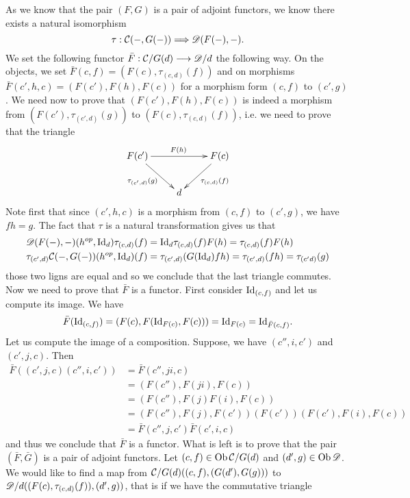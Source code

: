 \documentclass[11pt, a4paper, twoside]{article}
\begin{document}
As we know that the pair $(F,G)$ is a pair of adjoint functors, we know there exists a natural isomorphism
\begin{displaymath}
	\tau:\mathcal{C}(-,G(-))\Longrightarrow\mathscr D(F(-),-).
\end{displaymath}
We set the following functor $\bar{F}:\mathcal{C}/G(d)\longrightarrow\mathscr D/d$ the following way. On the objects, we set $\bar{F}(c,f)=(F(c),\tau_{(c,d)}(f))$ and on morphisms $\bar{F}(c',h,c)=(F(c'),F(h),F(c))$ for a morphism form $(c,f)$ to $(c',g)$. We need now to prove that $(F(c'),F(h),F(c))$ is indeed a morphism from $(F(c'),\tau_{(c',d)}(g))$ to $(F(c),\tau_{(c,d)}(f))$, i.e. we need to prove that the triangle
\begin{displaymath}
	\xymatrix{
		F(c') \ar[rd]_{\tau_{(c',d)}(g)} \ar[rr]^{F(h)} & & F(c) \ar[ld]^{\tau_{(c,d)}(f)}\\
		& d
	} 
\end{displaymath}
Note first that since $(c',h,c)$ is a morphism from $(c,f)$ to $(c',g)$, we have $fh=g$. The fact that $\tau$ is a natural transformation gives us that 
\begin{align*}
	\mathscr D(F(-),-)(h^{op},\mathrm{Id}_d)\tau_{(c,d)}(f)&=\mathrm{Id}_d\tau_{(c,d)}(f)F(h)=\tau_{(c,d)}(f)F(h)  \\
	\tau_{(c',d)}\mathcal{C}(-,G(-))(h^{op},\mathrm{Id}_d)(f)&=\tau_{(c',d)}(G(\mathrm{Id}_d)fh)=\tau_{(c',d)}(fh)=\tau_{(c'd)}(g)
\end{align*}
	those two ligns are equal and so we conclude that the last triangle commutes.\\
Now we need to prove that $\bar{F}$ is a functor. First consider $\mathrm{Id}_{(c,f)}$ and let us compute its image. We have 
\begin{align*}
	\bar{F}(\mathrm{Id}_{(c,f)})=(F(c),F(\mathrm{Id}_{F(c)},F(c)))=\mathrm{Id}_{F(c)}=\mathrm{Id}_{\bar{F}(c,f)}.
\end{align*}
Let us compute the image of a composition. Suppose, we have $(c'',i,c')$ and $(c',j,c)$. Then 
\begin{align*}
	\bar{F}((c',j,c)(c'',i,c'))&=\bar{F}(c'',ji,c)\\
						&= (F(c''),F(ji),F(c))\\
						&= (F(c''),F(j)F(i),F(c))\\
						&= (F(c''),F(j),F(c'))(F(c'))(F(c'),F(i),F(c))\\
						&= \bar{F}(c'',j,c')\bar{F}(c',i,c)
\end{align*}
	and thus we conclude that $\bar{F}$ is a functor. What is left is to prove that the pair $(\bar{F},\bar{G})$ is a pair of adjoint functors. Let $(c,f)\in\operatorname{Ob}\mathcal{C}/G(d)$ and $(d',g)\in\operatorname{Ob}\mathscr D$. We would like to find a map from $\mathcal{C}/G(d)((c,f),(G(d'),G(g)))$ to $\mathscr D/d((F(c),\tau_{(c,d)}(f)),(d',g))$, that is if we have the commutative triangle 
\end{document}
